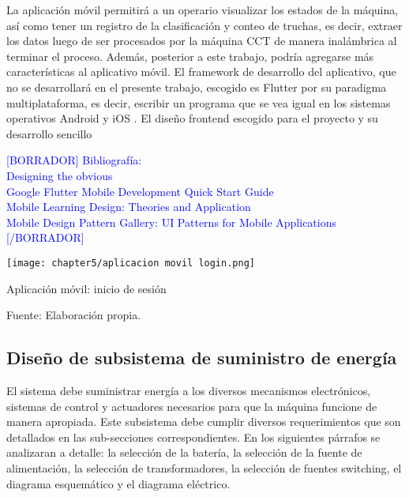 La aplicación móvil permitirá a un operario visualizar los estados de la máquina, así como tener un registro de la clasificación y conteo de truchas, es decir, extraer los datos luego de ser procesados por la máquina CCT de manera inalámbrica al terminar el proceso. Además, posterior a este trabajo, podría agregarse más características al aplicativo móvil. El framework de desarrollo del aplicativo, que no se desarrollará en el presente trabajo, escogido es Flutter por su paradigma multiplataforma, es decir, escribir un programa que se vea igual en los sistemas operativos Android y iOS \cite{Simone2020}. El diseño frontend escogido para el proyecto y su desarrollo sencillo 


\textcolor{blue}{[BORRADOR] 
	Bibliografía:\\
	Designing the obvious
	\cite{Joekman2010} \\
	Google Flutter Mobile Development Quick Start Guide
	\cite{PrajyotMainkar2019} \\
	Mobile Learning Design: Theories and Application
	\cite{Churchill2016} \\
	Mobile Design Pattern Gallery: UI Patterns for Mobile Applications
	\cite{Neil2012}
	[/BORRADOR]}



\begin{myfigure}[H]
	\footnotesize\centering
	\texttt{[image: chapter5/aplicacion movil login.png]}
	\caption{Aplicación móvil: inicio de sesión}
	\begin{myflushcenter}
		Fuente: Elaboración propia.
	\end{myflushcenter}
	\label{fig:aplicacion movil login}
\end{myfigure}

\subsection{Diseño de subsistema de suministro de energía}
\label{ssec:diseno de subsistema de suministro de energia}

El sistema debe suministrar energía a los diversos mecanismos electrónicos, sistemas de control y actuadores necesarios para que la máquina funcione de manera apropiada. Este subsistema debe cumplir diversos requerimientos que son detallados en las sub-secciones correspondientes. En los siguientes párrafos se analizaran a detalle: la selección de la batería, la selección de la fuente de alimentación, la selección de transformadores, la selección de fuentes switching, el diagrama esquemático y el diagrama eléctrico.

